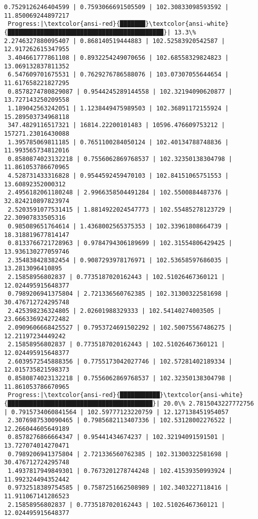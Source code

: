 \documentclass[11pt]{article}
\begin{document}
\begin{Verbatim}[commandchars=\\\{\}]
 0.7529126246404599 | 0.7593066691505509 | 102.30833098593592 | 11.850069244897217
 Progress:|\textcolor{ansi-red}{███████}\textcolor{ansi-white}{███████████████████████████████████████████}| 13.3\% 2.2746327880095407 | 0.868140519444883 | 102.52583920542587 | 12.917262615347955
 3.404661777861108 | 0.8932254249070656 | 102.68558329824823 | 13.069132837811352
 6.547609701675531 | 0.7629276786588076 | 103.07307055644654 | 11.617658221827295
 0.8578274780829087 | 0.9544245289144558 | 102.32194090620877 | 13.727143250209558
 1.189042563242051 | 1.1238449475989503 | 102.36891172155924 | 15.289503734968118
 347.4829116517321 | 16814.22200101483 | 10596.476609753212 | 157271.23016430088
 1.395785069811185 | 0.7651100284050124 | 102.40134788748836 | 11.993565734812016
 0.8580874023132218 | 0.7556062869768537 | 102.32350138304798 | 11.861053786670965
 4.528731433316828 | 0.9544592459470103 | 102.84151065751553 | 13.60892352000312
 2.4956182061180248 | 2.9966358504491284 | 102.5500884487376 | 32.824210897823974
 2.5203591077531415 | 1.8814922024547773 | 102.55485278123729 | 22.30907833505316
 0.985089651764614 | 1.4368002565375353 | 102.33961808664739 | 18.318819677814147
 0.8133766721728963 | 0.9784794306189699 | 102.31554806429425 | 13.936130277059746
 2.354838428382454 | 0.9087293978176971 | 102.53658597686035 | 13.2813096410895
 2.15858956802837 | 0.7735187020162443 | 102.51026467360121 | 12.024495915648377
 0.7989206941375804 | 2.721336560762385 | 102.31300322581698 | 30.476712724295748
 2.425398236324805 | 2.02601988329333 | 102.54140274003505 | 23.666336924272482
 2.0909606668425527 | 0.7953724691502292 | 102.50075567486275 | 12.21197234449242
 2.15858956802837 | 0.7735187020162443 | 102.51026467360121 | 12.024495915648377
 2.6039572545888356 | 0.7755173042027746 | 102.57281402189334 | 12.015735821598373
 0.8580874023132218 | 0.7556062869768537 | 102.32350138304798 | 11.861053786670965
 Progress:|\textcolor{ansi-red}{███████████}\textcolor{ansi-white}{████████████████████████████████████████}| 20.0\% 2.7815043227772756 | 0.7915734060841564 | 102.59777123220759 | 12.127138451954057
 2.3076987530090465 | 0.7985682113407336 | 102.53128002276522 | 12.266044605649189
 0.8578276866664347 | 0.95441434674237 | 102.32194091591501 | 13.727074014270471
 0.7989206941375804 | 2.721336560762385 | 102.31300322581698 | 30.476712724295748
 1.4937817949849301 | 0.7673201278744248 | 102.41539350993924 | 11.992324494352442
 0.9732518389754585 | 0.7587251662508989 | 102.3403227118416 | 11.911067141286523
 2.15858956802837 | 0.7735187020162443 | 102.51026467360121 | 12.024495915648377

\end{Verbatim}
\end{document}
